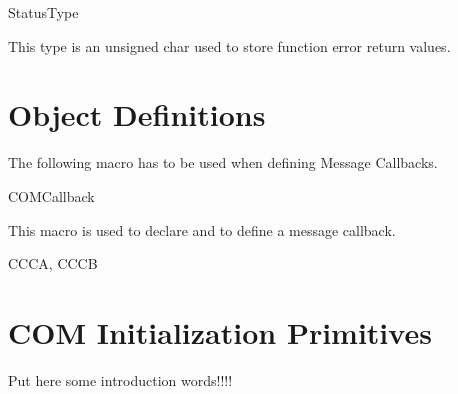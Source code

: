 \begin{type}{StatusType}
  \begin{typedescription}
    This type is an unsigned char used to store function error return values.
  \end{typedescription}
\end{type}


\pagebreak


\section{Object Definitions}
The following macro has to be used when defining Message Callbacks.

\begin{function_nopb}{COMCallback}
  \begin{fundescription}
    This macro is used to declare and to define a message callback.
  \end{fundescription}
  \begin{funparameters}
  \end{funparameters}
  \begin{funconformance}
    CCCA, CCCB
  \end{funconformance}
\end{function_nopb}






\pagebreak


\section{COM Initialization Primitives}

Put here some introduction words!!!!


